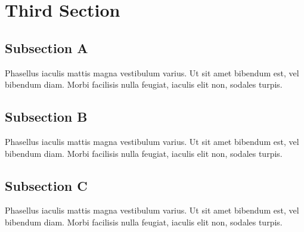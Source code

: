 \par\section{Third Section}
\par\subsection{Subsection A}
\par\noindent Phasellus iaculis mattis magna vestibulum varius. Ut sit amet bibendum est, vel bibendum diam. Morbi facilisis nulla feugiat, iaculis elit non, sodales turpis.
\par\subsection{Subsection B}
\par\noindent Phasellus iaculis mattis magna vestibulum varius. Ut sit amet bibendum est, vel bibendum diam. Morbi facilisis nulla feugiat, iaculis elit non, sodales turpis.
\par\subsection{Subsection C}
\par\noindent Phasellus iaculis mattis magna vestibulum varius. Ut sit amet bibendum est, vel bibendum diam. Morbi facilisis nulla feugiat, iaculis elit non, sodales turpis.
